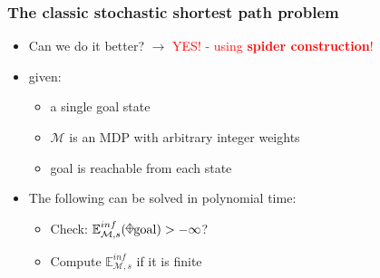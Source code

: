 \documentclass[onlymath]{beamer}
\begin{document}
\begin{frame}
\frametitle{The classic stochastic shortest path problem}
\begin{itemize}
	\item Can we do it better? \pause $\longrightarrow$ \textcolor{red}{YES! - using \textbf{spider construction}!} \pause
	\item given:
	\begin{itemize}
		\item a single goal state
		 \pause
		\item $\mathcal{M}$ is an MDP with arbitrary integer weights \pause
		\item goal is reachable from each state \pause
	\end{itemize}
	\item The following can be solved in polynomial time:
	\begin{itemize}
		\item Check: $\mathbb{E}_{\mathcal{M},s}^{inf}(\rawdiaplus \mathrm{goal}) > - \infty$?
		\item Compute $\mathbb{E}_{\mathcal{M},s}^{inf}$ if it is finite
	\end{itemize}

\end{itemize}
\end{frame}%
\end{document}
